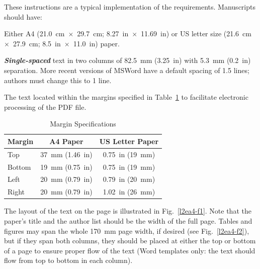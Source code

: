 \documentclass[acus,%
              ]{jacow}
\begin{document}
These instructions are a typical implementation of the
requirements. Manuscripts should have:
\begin{Itemize}
    \item  Either A4 (\SI{21.0}{cm}~$\times$~\SI{29.7}{cm}; \SI{8.27}{in}~$\times$~\SI{11.69}{in}) or US
           letter size (\SI{21.6}{cm}~$\times$~\SI{27.9}{cm}; \SI{8.5}{in}~$\times$~\SI{11.0}{in}) paper.
    \item  \textit{\textbf{Single-spaced}} text in two columns of \SI{82.5}{mm} (\SI{3.25}{in}) with \SI{5.3}{mm}
           (\SI{0.2}{in}) separation. More recent versions of MSWord have a default spacing of 1.5 lines;
           authors must change this to 1 line.
    \item  The text located within the margins specified in Table~\ref{l2ea4-t1}
           to facilitate electronic processing of the PDF file.
\end{Itemize}
\begin{table}[hbt]
   \centering
   \caption{Margin Specifications}
   \begin{tabular}{lcc}
       \toprule
       \textbf{Margin} & \textbf{A4 Paper}                      & \textbf{US Letter Paper} \\
       \midrule
           Top         & \SI{37}{mm} (\SI{1.46}{in})            & \SI{0.75}{in} (\SI{19}{mm})        \\
          Bottom       & \SI{19}{mm} (\SI{0.75}{in})            & \SI{0.75}{in} (\SI{19}{mm})        \\
           Left        & \SI{20}{mm} (\SI{0.79}{in})            & \SI{0.79}{in} (\SI{20}{mm})        \\
           Right       & \SI{20}{mm} (\SI{0.79}{in})            & \SI{1.02}{in} (\SI{26}{mm})        \\
       \bottomrule
   \end{tabular}
   \label{l2ea4-t1}
\end{table}

The layout of the text on the page is illustrated in
Fig.~\ref{l2ea4-f1}. Note that the paper's title and the author list should be
the width of the full page. Tables and figures may span the whole \SI{170}{mm} page width,
if desired (see Fig.~\ref{l2ea4-f2}), but if they span both columns, they should be placed at
either the top or bottom of a page to ensure proper flow of the text
(Word templates only: the text should flow from top to bottom in each column).
\end{document}
